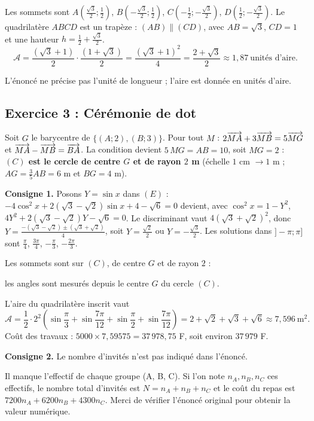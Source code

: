 Les sommets sont $A(\frac{\sqrt3}{2};\frac12)$, $B(-\frac{\sqrt3}{2};\frac12)$, $C(-\frac12;-\frac{\sqrt3}{2})$,
$D(\frac12;-\frac{\sqrt3}{2})$. Le quadrilat\`ere $ABCD$ est un trap\`eze : $(AB)\parallel(CD)$, avec
$AB=\sqrt3$, $CD=1$ et une hauteur $h=\frac12+\frac{\sqrt3}{2}$.
\[
\mathcal A=\frac{(\sqrt3+1)}{2}\cdot\frac{(1+\sqrt3)}{2}=\frac{(\sqrt3+1)^2}{4}=\frac{2+\sqrt3}{2}\approx 1{,}87\ \text{unit\'es d'aire}.
\]
\begin{rem} L'\'enonc\'e ne pr\'ecise pas l'unit\'e de longueur ; l'aire est donn\'ee en unit\'es d'aire.\end{rem}

\subsection{Exercice 3 : C\'er\'emonie de dot}

Soit $G$ le barycentre de $\{(A;2),(B;3)\}$. Pour tout $M$ :
$2\overrightarrow{MA}+3\overrightarrow{MB}=5\overrightarrow{MG}$ et $\overrightarrow{MA}-\overrightarrow{MB}=\overrightarrow{BA}$.
La condition devient $5\,MG=AB=10$, soit $MG=2$ : \textbf{$(C)$ est le cercle de centre $G$ et de rayon $2$ m}
(\'echelle $1$ cm $\to 1$ m ; $AG=\frac35AB=6$ m et $BG=4$ m).

\medskip\noindent\textbf{Consigne 1.} Posons $Y=\sin x$ dans $(E)$ :
$-4\cos^2x+2(\sqrt3-\sqrt2)\sin x+4-\sqrt6=0$ devient, avec $\cos^2x=1-Y^2$,
$4Y^2+2(\sqrt3-\sqrt2)Y-\sqrt6=0$. Le discriminant vaut $4(\sqrt3+\sqrt2)^2$, donc
$Y=\frac{-(\sqrt3-\sqrt2)\pm(\sqrt3+\sqrt2)}{4}$, soit $Y=\frac{\sqrt2}{2}$ ou $Y=-\frac{\sqrt3}{2}$.
Les solutions dans $]-\pi;\pi]$ sont $\frac{\pi}{4}$, $\frac{3\pi}{4}$, $-\frac{\pi}{3}$, $-\frac{2\pi}{3}$.

Les sommets sont sur $(C)$, de centre $G$ et de rayon $2$ :
\begin{hyp}les angles sont mesur\'es depuis le centre $G$ du cercle $(C)$.\end{hyp}
L'aire du quadrilat\`ere inscrit vaut
\[
\mathcal A=\frac12\cdot 2^2\left(\sin\frac{\pi}{3}+\sin\frac{7\pi}{12}+\sin\frac{\pi}{2}+\sin\frac{7\pi}{12}\right)
=2+\sqrt2+\sqrt3+\sqrt6\approx 7{,}596\ \text{m}^2 .
\]
Co\^ut des travaux : $5000\times 7{,}59575=37\,978{,}75$ F, soit environ $37\,979$ F.

\medskip\noindent\textbf{Consigne 2.} Le nombre d'invit\'es n'est pas indiqu\'e dans l'\'enonc\'e.
\begin{rem} Il manque l'effectif de chaque groupe (A, B, C). Si l'on note $n_A,n_B,n_C$ ces effectifs, le nombre total
d'invit\'es est $N=n_A+n_B+n_C$ et le co\^ut du repas est $7200n_A+6200n_B+4300n_C$.
Merci de v\'erifier l'\'enonc\'e original pour obtenir la valeur num\'erique.\end{rem}

